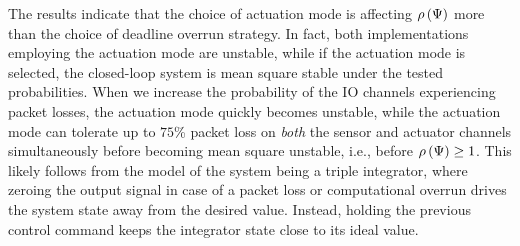 The results indicate that the choice of actuation mode is affecting $\rho\left( \Psi \right)$ more than the choice of deadline overrun strategy.
In fact, both implementations employing the \tZ{} actuation mode are unstable, while if the \tH{} actuation mode is selected, the closed-loop system is mean square stable under the tested probabilities.
When we increase the probability of the IO channels experiencing packet losses, the \tZ{} actuation mode quickly becomes unstable, while the \tH{} actuation mode can tolerate up to $75$\% packet loss on \emph{both} the sensor and actuator channels simultaneously before becoming mean square unstable, i.e., before $\rho\left( \Psi \right) \geq 1$.
This likely follows from the model of the system being a triple integrator, where zeroing the output signal in case of a packet loss or computational overrun drives the system state away from the desired value.
Instead, holding the previous control command keeps the integrator state close to its ideal value.  
